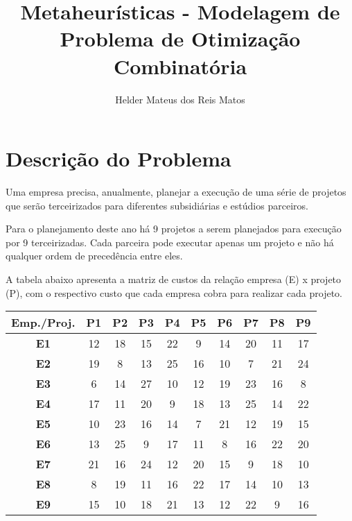 \documentclass[12pt]{article}
\title{Metaheurísticas - Modelagem de Problema de Otimização Combinatória}
\author{Helder Mateus dos Reis Matos\inst{1}}
\begin{document}
 

\maketitle

\section{Descrição do Problema}

Uma empresa precisa, anualmente, planejar a execução de uma série de projetos que serão terceirizados para diferentes subsidiárias e estúdios parceiros.

Para o planejamento deste ano há 9 projetos a serem planejados para execução por 9 terceirizadas. Cada parceira pode executar apenas um projeto e não há qualquer ordem de precedência entre eles.

A tabela abaixo apresenta a matriz de custos da relação empresa (E) x projeto (P), com o respectivo custo que cada empresa cobra para realizar cada projeto.

\begin{table}[!h]
\centering
\begin{tabular}{|c|c|c|c|c|c|c|c|c|c|}
\hline
\textbf{Emp./Proj.} & \textbf{P1} & \textbf{P2} & \textbf{P3} & \textbf{P4} & \textbf{P5} & \textbf{P6} & \textbf{P7} & \textbf{P8} & \textbf{P9} \\ \hline
\textbf{E1}         & 12          & 18          & 15          & 22          & 9           & 14          & 20          & 11          & 17          \\ \hline
\textbf{E2}         & 19          & 8           & 13          & 25          & 16          & 10          & 7           & 21          & 24          \\ \hline
\textbf{E3}         & 6           & 14          & 27          & 10          & 12          & 19          & 23          & 16          & 8           \\ \hline
\textbf{E4}         & 17          & 11          & 20          & 9           & 18          & 13          & 25          & 14          & 22          \\ \hline
\textbf{E5}         & 10          & 23          & 16          & 14          & 7           & 21          & 12          & 19          & 15          \\ \hline
\textbf{E6}         & 13          & 25          & 9           & 17          & 11          & 8           & 16          & 22          & 20          \\ \hline
\textbf{E7}         & 21          & 16          & 24          & 12          & 20          & 15          & 9           & 18          & 10          \\ \hline
\textbf{E8}         & 8           & 19          & 11          & 16          & 22          & 17          & 14          & 10          & 13          \\ \hline
\textbf{E9}         & 15          & 10          & 18          & 21          & 13          & 12          & 22          & 9           & 16          \\ \hline
\end{tabular}
\end{table}
\end{document}
